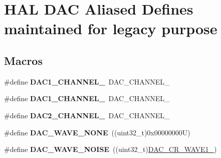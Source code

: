 \hypertarget{group___h_a_l___d_a_c___aliased___defines}{\section{H\-A\-L D\-A\-C Aliased Defines maintained for legacy purpose}
\label{group___h_a_l___d_a_c___aliased___defines}
}
\subsection*{Macros}
\begin{DoxyCompactItemize}
\item 
\hypertarget{group___h_a_l___d_a_c___aliased___defines_gacd0eabd250f1026912b0e3f7deecb2e7}{\#define {\bfseries D\-A\-C1\-\_\-\-C\-H\-A\-N\-N\-E\-L\-\_}~D\-A\-C\-\_\-\-C\-H\-A\-N\-N\-E\-L\-\_}\label{group___h_a_l___d_a_c___aliased___defines_gacd0eabd250f1026912b0e3f7deecb2e7}

\item 
\hypertarget{group___h_a_l___d_a_c___aliased___defines_ga6358f0c4cfc9a0e67a739bf6cf17870c}{\#define {\bfseries D\-A\-C1\-\_\-\-C\-H\-A\-N\-N\-E\-L\-\_}~D\-A\-C\-\_\-\-C\-H\-A\-N\-N\-E\-L\-\_}\label{group___h_a_l___d_a_c___aliased___defines_ga6358f0c4cfc9a0e67a739bf6cf17870c}

\item 
\hypertarget{group___h_a_l___d_a_c___aliased___defines_ga8d40044bd0865cdb12fea604852f2582}{\#define {\bfseries D\-A\-C2\-\_\-\-C\-H\-A\-N\-N\-E\-L\-\_}~D\-A\-C\-\_\-\-C\-H\-A\-N\-N\-E\-L\-\_}\label{group___h_a_l___d_a_c___aliased___defines_ga8d40044bd0865cdb12fea604852f2582}

\item 
\hypertarget{group___h_a_l___d_a_c___aliased___defines_ga7e80010819867e162e936510093a4cef}{\#define {\bfseries D\-A\-C\-\_\-\-W\-A\-V\-E\-\_\-\-N\-O\-N\-E}~((uint32\-\_\-t)0x00000000\-U)}\label{group___h_a_l___d_a_c___aliased___defines_ga7e80010819867e162e936510093a4cef}

\item 
\hypertarget{group___h_a_l___d_a_c___aliased___defines_ga4585a41ff6dfd14971119283f1d8045b}{\#define {\bfseries D\-A\-C\-\_\-\-W\-A\-V\-E\-\_\-\-N\-O\-I\-S\-E}~((uint32\-\_\-t)\hyperlink{group___peripheral___registers___bits___definition_ga0871e6466e3a7378103c431832ae525a}{D\-A\-C\-\_\-\-C\-R\-\_\-\-W\-A\-V\-E1\-\_})}\label{group___h_a_l___d_a_c___aliased___defines_ga4585a41ff6dfd14971119283f1d8045b}


\end{DoxyCompactItemize}
